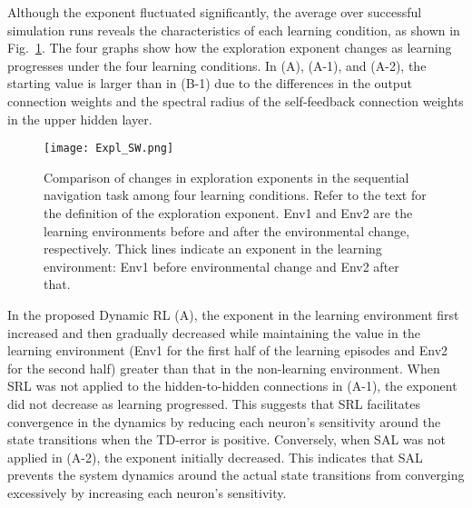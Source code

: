 Although the exponent fluctuated significantly, the average over successful simulation runs
reveals the characteristics of each learning condition, as shown in Fig.~\ref{fig:ExplExponent}.
The four graphs show how the exploration exponent changes as learning progresses
under the four learning conditions.
In (A), (A-1), and (A-2), the starting value is larger than in (B-1)
due to the differences in the output connection weights
and the spectral radius of the self-feedback connection weights in the upper hidden layer.
\begin{figure}[tb]
\centerline{\texttt{[image: Expl\_SW.png]}}
\caption{Comparison of changes in exploration exponents in the sequential navigation task
among four learning conditions.
Refer to the text for the definition of the exploration exponent.
Env1 and Env2 are the learning environments before and after the environmental change, respectively.
Thick lines indicate an exponent in the learning environment: Env1 before environmental change and
Env2 after that.}
\label{fig:ExplExponent}
\end{figure}

In the proposed Dynamic RL (A), the exponent in the learning environment first increased
and then gradually decreased while maintaining the value in the learning environment
(Env1 for the first half of the learning episodes and Env2 for the second half)
greater than that in the non-learning environment.
When SRL was not applied to the hidden-to-hidden connections in (A-1),
the exponent did not decrease as learning progressed.
This suggests that SRL facilitates convergence in the dynamics by reducing each neuron's sensitivity
around the state transitions when the TD-error is positive.
Conversely, when SAL was not applied in (A-2), the exponent initially decreased.
This indicates that SAL prevents the system dynamics around the actual state transitions
from converging excessively by increasing each neuron's sensitivity.


